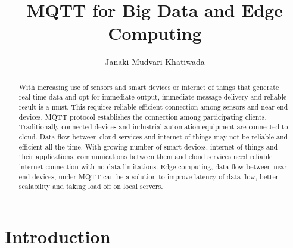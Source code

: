 \documentclass[sigconf]{acmart}
\begin{document}
\title{MQTT for Big Data and Edge Computing}


\author{Janaki Mudvari Khatiwada}





\begin{abstract}
With increasing use of sensors and smart devices or internet of things that generate real time data and opt for immediate output, immediate message delivery and reliable result is a must. This requires reliable efficient connection among sensors and near end devices. MQTT protocol  establishes the connection among participating clients. Traditionally connected  devices and industrial automation equipment are  connected to cloud. Data flow between cloud services and internet of things may not be reliable and efficient all the time. With growing number of smart devices, internet of things and their applications, communications between them and cloud services need reliable internet connection with no data limitations. Edge computing, data flow between near end devices, under MQTT can be a solution to improve latency of data flow,  better scalability and taking load off on local servers.
\end{abstract}



\maketitle



\section{Introduction}
\end{document}
